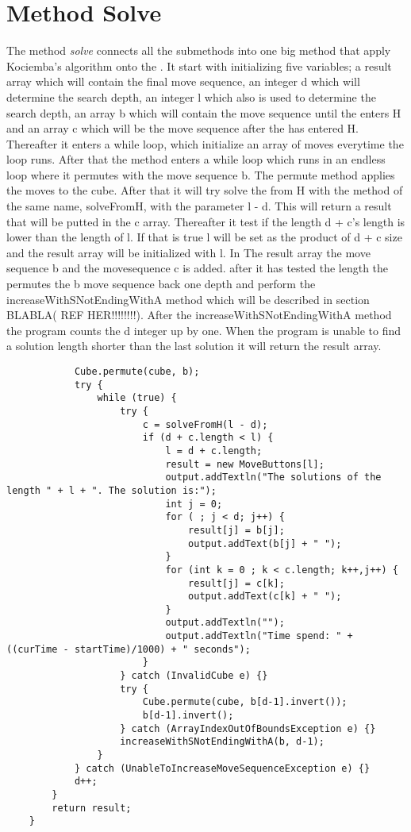 \section{Method Solve}

The method \textit{solve} connects all the submethods into one big method that apply Kociemba's algorithm onto the \rubik{}. It start with initializing five variables; a result array which will contain the final move sequence, an integer d which will determine the search depth, an integer l which also is used to determine the search depth, an array b which will contain the move sequence until the \rubik{} enters H and an array c which will be the move sequence after the \rubik{} has entered H. Thereafter it enters a while loop, which initialize an array of moves everytime the loop runs. After that the method enters a while loop which runs in an endless loop where it permutes with the move sequence b. The permute method applies the moves to the cube. After that it will try solve the \rubik{} from H with the method of the same name, solveFromH, with the parameter l - d.  This will return a result that will be putted in the c array. Thereafter it test if the length d + c's length is lower than the length of l. If that is true  l will be set as the product of d + c size and the result array will be initialized with l. In The result array the move sequence b and the movesequence c is added. after it has tested the length the \rubik{}  permutes the b move sequence back one depth and perform the increaseWithSNotEndingWithA method which will be described in section BLABLA( REF HER!!!!!!!!). After the increaseWithSNotEndingWithA method the program counts the d integer up by one. When the program is unable to find a solution length shorter than the last solution it will return the result array.


\begin{verbatim}
			Cube.permute(cube, b);
			try {
				while (true) {
					try {
						c = solveFromH(l - d);
						if (d + c.length < l) {
							l = d + c.length;
							result = new MoveButtons[l];
							output.addTextln("The solutions of the length " + l + ". The solution is:");
							int j = 0;
							for ( ; j < d; j++) {
								result[j] = b[j];
								output.addText(b[j] + " ");
							}
							for (int k = 0 ; k < c.length; k++,j++) {
								result[j] = c[k];
								output.addText(c[k] + " ");
							}
							output.addTextln("");
							output.addTextln("Time spend: " + ((curTime - startTime)/1000) + " seconds");
						}
					} catch (InvalidCube e) {}
					try {
						Cube.permute(cube, b[d-1].invert());
						b[d-1].invert();
					} catch (ArrayIndexOutOfBoundsException e) {}
					increaseWithSNotEndingWithA(b, d-1);
				}
			} catch (UnableToIncreaseMoveSequenceException e) {}
			d++;
		}
		return result;
	}
\end{verbatim}